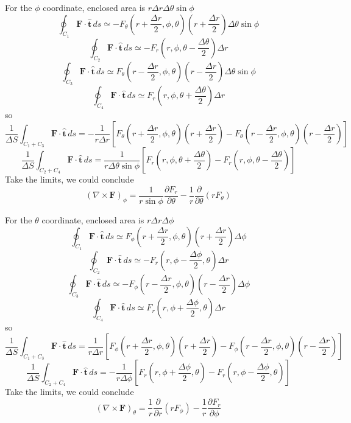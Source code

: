 \documentclass{article}
\begin{document}
\begin{homeworkProblem}
	For the $\phi$ coordinate, enclosed area is $r\Delta r\Delta\theta\sin\phi$
	\[
		\oint_{C_1}\mathbf{F}\cdot\hat{\mathbf{t}}\,ds\simeq-F_\theta\left(r+\frac{\Delta r}{2},\phi,\theta\right)\left(r+\frac{\Delta r}{2}\right)\Delta\theta\sin\phi
	\]
	\[
		\oint_{C_2}\mathbf{F}\cdot\hat{\mathbf{t}}\,ds\simeq-F_r\left(r,\phi,\theta-\frac{\Delta\theta}{2}\right)\Delta r
	\]
	\[
		\oint_{C_3}\mathbf{F}\cdot\hat{\mathbf{t}}\,ds\simeq F_\theta\left(r-\frac{\Delta r}{2},\phi,\theta\right)\left(r-\frac{\Delta r}{2}\right)\Delta\theta\sin\phi
	\]
	\[
		\oint_{C_4}\mathbf{F}\cdot\hat{\mathbf{t}}\,ds\simeq F_r\left(r,\phi,\theta+\frac{\Delta\theta}{2}\right)\Delta r
	\]
	so
	\[
		\frac{1}{\Delta S}\int_{C_1+C_3}\mathbf{F}\cdot\hat{\mathbf{t}}\,ds=-\frac{1}{r\Delta r}\left[F_\theta\left(r+\frac{\Delta r}{2},\phi,\theta\right)\left(r+\frac{\Delta r}{2}\right)-F_\theta\left(r-\frac{\Delta r}{2},\phi,\theta\right)\left(r-\frac{\Delta r}{2}\right)\right]
	\]
	\[
		\frac{1}{\Delta S}\int_{C_2+C_4}\mathbf{F}\cdot\hat{\mathbf{t}}\,ds=\frac{1}{r\Delta\theta\sin\phi}\left[F_r\left(r,\phi,\theta+\frac{\Delta\theta}{2}\right)-F_r\left(r,\phi,\theta-\frac{\Delta\theta}{2}\right)\right]
	\]
	Take the limits, we could conclude
	\[
		(\nabla\times\mathbf{F})_\phi=\frac{1}{r\sin\phi}\frac{\partial F_r}{\partial\theta}-\frac{1}{r}\frac{\partial}{\partial\theta}(rF_\theta)
	\]

	For the $\theta$ coordinate, enclosed area is $r\Delta r\Delta\phi$
	\[
		\oint_{C_1}\mathbf{F}\cdot\hat{\mathbf{t}}\,ds\simeq F_\phi\left(r+\frac{\Delta r}{2},\phi,\theta\right)\left(r+\frac{\Delta r}{2}\right)\Delta\phi
	\]
	\[
		\oint_{C_2}\mathbf{F}\cdot\hat{\mathbf{t}}\,ds\simeq-F_r\left(r,\phi-\frac{\Delta\phi}{2},\theta\right)\Delta r
	\]
	\[
		\oint_{C_3}\mathbf{F}\cdot\hat{\mathbf{t}}\,ds\simeq-F_\phi\left(r-\frac{\Delta r}{2},\phi,\theta\right)\left(r-\frac{\Delta r}{2}\right)\Delta\phi
	\]
	\[
		\oint_{C_4}\mathbf{F}\cdot\hat{\mathbf{t}}\,ds\simeq F_r\left(r,\phi+\frac{\Delta\phi}{2},\theta\right)\Delta r
	\]
	so
	\[
		\frac{1}{\Delta S}\int_{C_1+C_3}\mathbf{F}\cdot\hat{\mathbf{t}}\,ds=\frac{1}{r\Delta r}\left[F_\phi\left(r+\frac{\Delta r}{2},\phi,\theta\right)\left(r+\frac{\Delta r}{2}\right)-F_\phi\left(r-\frac{\Delta r}{2},\phi,\theta\right)\left(r-\frac{\Delta r}{2}\right)\right]
	\]
	\[
		\frac{1}{\Delta S}\int_{C_2+C_4}\mathbf{F}\cdot\hat{\mathbf{t}}\,ds=-\frac{1}{r\Delta\phi}\left[F_r\left(r,\phi+\frac{\Delta\phi}{2},\theta\right)-F_r\left(r,\phi-\frac{\Delta\phi}{2},\theta\right)\right]
	\]
	Take the limits, we could conclude
	\[
		(\nabla\times\mathbf{F})_\theta=\frac{1}{r}\frac{\partial}{\partial r}(rF_\phi)-\frac{1}{r}\frac{\partial F_r}{\partial\phi}
	\]
\end{homeworkProblem}
\end{document}
